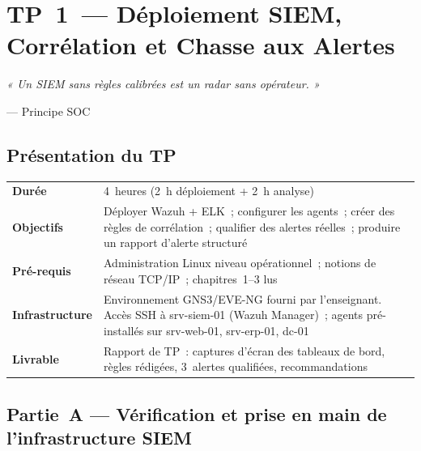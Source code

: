 
\chapter{TP~1~— Déploiement SIEM, Corrélation et Chasse aux Alertes}
\label{lab:siem}

\epigraph{\itshape « Un SIEM sans règles calibrées est un radar sans opérateur. »}
         {--- Principe SOC}

\section*{Présentation du TP}

\begin{table}[H]
\centering\small
{}
\begin{tabular}{p{3.5cm}p{10cm}}
\toprule
\textbf{Durée} & 4~heures (2~h déploiement + 2~h analyse) \\
\textbf{Objectifs} & Déployer Wazuh + ELK~; configurer les agents~; créer
  des règles de corrélation~; qualifier des alertes réelles~; produire
  un rapport d'alerte structuré \\
\textbf{Pré-requis} & Administration Linux niveau opérationnel~;
  notions de réseau TCP/IP~; chapitres~1--3 lus \\
\textbf{Infrastructure} & Environnement GNS3/EVE-NG fourni par l'enseignant.
  Accès SSH à srv-siem-01 (Wazuh Manager)~; agents pré-installés sur
  srv-web-01, srv-erp-01, dc-01 \\
\textbf{Livrable} & Rapport de TP~: captures d'écran des tableaux de bord,
  règles rédigées, 3~alertes qualifiées, recommandations \\
\bottomrule
\end{tabular}
\end{table}


\section{Partie~A — Vérification et prise en main de l'infrastructure SIEM}
\label{lab1:partieA}

